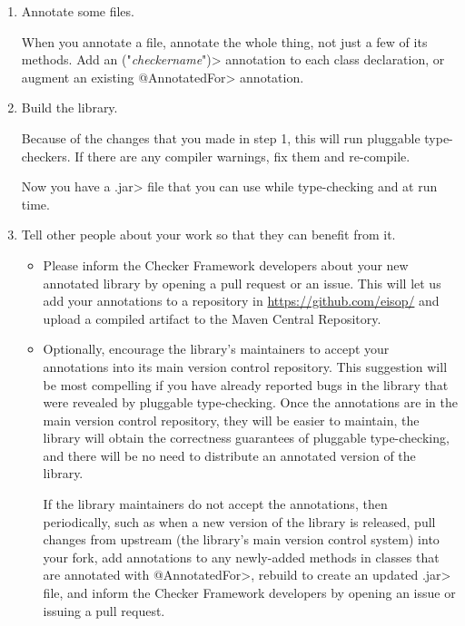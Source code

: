 \begin{enumerate}
\begin{itemize}
  You are not adding new build targets, but modifying existing targets.
  The reason to run every type-checker is to verify
  the annotations you wrote, and to use appropriate defaults for all
  unannotated type uses.
  \end{itemize}

\item Annotate some files.

  When you annotate a file, annotate the whole thing, not just a few of its
  methods.  Add an
  \<(\ttlcb"\emph{checkername}"\ttrcb)>
  annotation to each class declaration, or augment an existing \<@AnnotatedFor>
  annotation.

\item
  Build the library.

  Because of the changes that you made in step 1, this will run pluggable
  type-checkers.  If there are any compiler warnings, fix them and re-compile.

  Now you have a \<.jar> file that you can use while type-checking and at
  run time.

\item
  Tell other people about your work so that they can benefit from it.

  \begin{itemize}
  \item
    Please inform the Checker Framework developers
    about your new annotated library by opening a pull request or an issue.
    This will let us add your annotations to a repository in
    \url{https://github.com/eisop/} and upload a compiled artifact to
    the Maven Central Repository.

  \item
    Optionally, encourage the library's maintainers to accept your annotations into its
    main version control repository.  This suggestion will be most
    compelling if you have already reported bugs in the library that were
    revealed by pluggable type-checking.  Once the annotations are in the
    main version control repository, they will be easier
    to maintain, the library will obtain the correctness guarantees of
    pluggable type-checking, and there will be no need
    to distribute an annotated version of the library.

    If the library maintainers do not accept the annotations, then
    periodically, such as when a new version of the library is released,
    pull changes from upstream (the library's main version control system)
    into your fork, add annotations to any newly-added methods in classes
    that are annotated with \<@AnnotatedFor>, rebuild to create an updated
    \<.jar> file, and inform the Checker Framework developers by opening an
    issue or issuing a pull request.
  \end{itemize}

\end{enumerate}


